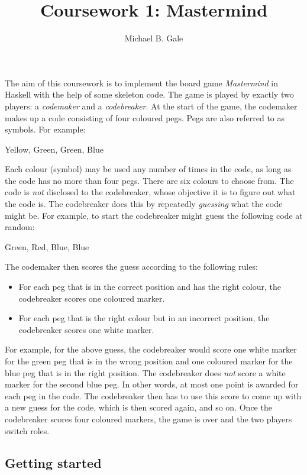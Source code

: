 \documentclass{cs256-shared/cs256}
\author{Michael B. Gale}
\title{Coursework 1: Mastermind}
\begin{document}
\makeheader


The aim of this coursework is to implement the board game \emph{Mastermind} in Haskell with the help of some skeleton code. The game is played by exactly two players: a \emph{codemaker} and a \emph{codebreaker}. At the start of the game, the codemaker makes up a code consisting of four coloured pegs. Pegs are also referred to as symbols. For example:
\begin{center}
    Yellow, Green, Green, Blue
\end{center}
Each colour (symbol) may be used any number of times in the code, as long as the code has no more than four pegs. There are six colours to choose from. The code is \emph{not} disclosed to the codebreaker, whose objective it is to figure out what the code is. The codebreaker does this by repeatedly \emph{guessing} what the code might be. For example, to start the codebreaker might guess the following code at random:
\begin{center}
    Green, Red, Blue, Blue
\end{center}
The codemaker then scores the guess according to the following rules:
\begin{itemize}
    \item For each peg that is in the correct position and has the right colour, the codebreaker scores one coloured marker.
    \item For each peg that is the right colour but in an incorrect position, the codebreaker scores one white marker.
\end{itemize}
For example, for the above guess, the codebreaker would score one white marker for the green peg that is in the wrong position and one coloured marker for the blue peg that is in the right position. The codebreaker does \emph{not} score a white marker for the second blue peg. In other words, at most one point is awarded for each peg in the code. The codebreaker then has to use this score to come up with a new guess for the code, which is then scored again, and so on. Once the codebreaker scores four coloured markers, the game is over and the two players switch roles.


\subsection*{Getting started}
\end{document}
